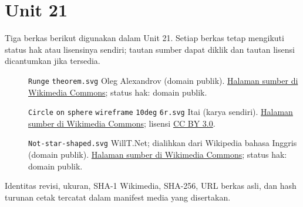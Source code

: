 \section*{Unit 21}
Tiga berkas berikut digunakan dalam Unit 21. Setiap berkas tetap mengikuti status hak atau lisensinya sendiri; tautan sumber dapat diklik dan tautan lisensi dicantumkan jika tersedia.
\begin{description}
\item[]\texttt{Runge} \texttt{theorem.svg}
Oleg Alexandrov (domain publik).
\href{https://commons.wikimedia.org/wiki/File:Runge_theorem.svg}{Halaman sumber di Wikimedia Commons}; status hak: domain publik.
\item[]\texttt{Circle} \texttt{on} \texttt{sphere} \texttt{wireframe} \texttt{10deg} \texttt{6r.svg}
Itai (karya sendiri).
\href{https://commons.wikimedia.org/wiki/File:Circle_on_sphere_wireframe_10deg_6r.svg}{Halaman sumber di Wikimedia Commons}; lisensi \href{https://creativecommons.org/licenses/by/3.0/}{CC BY 3.0}.
\item[]\texttt{Not-star-shaped.svg}
WillT.Net; dialihkan dari Wikipedia bahasa Inggris (domain publik).
\href{https://commons.wikimedia.org/wiki/File:Not-star-shaped.svg}{Halaman sumber di Wikimedia Commons}; status hak: domain publik.
\end{description}
Identitas revisi, ukuran, SHA-1 Wikimedia, SHA-256, URL berkas asli, dan hash turunan cetak tercatat dalam manifest media yang disertakan.
